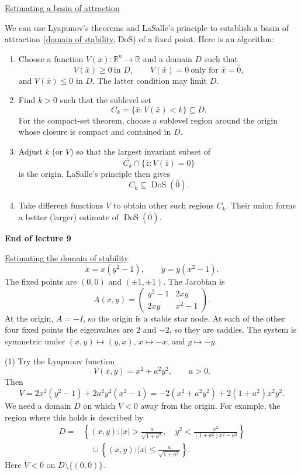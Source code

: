 \documentclass[11pt,a4paper]{article}
\begin{document}
\medskip
\noindent\underline{Estimating a basin of attraction}

\medskip
\noindent We can use Lyapunov's theorems and LaSalle's principle to establish
a basin of attraction (\underline{domain of stability}, DoS) of a fixed point.
Here is an algorithm:
\begin{enumerate}
\setlength{\itemsep}{9pt}
\item Choose a function $V(\bar x):\mathbb R^n\to\mathbb R$ and a domain $D$
such that
\[
V(\bar x)\geq0\ \text{in }D,\qquad
V(\bar x)=0\ \text{only for }\bar x=\bar0,
\]
and $\dot V(\bar x)\leq0$ in $D$. The latter condition may limit $D$.
\item Find $k>0$ such that the sublevel set
\[
C_k=\{\bar x:V(\bar x)<k\}\subseteq D.
\]
For the compact-set theorem, choose a sublevel region around the origin
whose closure is compact and contained in $D$.
\item Adjust $k$ (or $V$) so that the largest invariant subset of
\[
\overline{C_k}\cap\{\bar z:\dot V(\bar z)=0\}
\]
is the origin. LaSalle's principle then gives
\[
C_k\subseteq\operatorname{DoS}(\bar0).
\]
\item Take different functions $V$ to obtain other such regions $C_k$.
Their union forms a better (larger) estimate of $\operatorname{DoS}(\bar0)$.
\end{enumerate}

\begin{center}
\textbf{End of lecture 9}
\end{center}

\newpage
\noindent{}\quad\underline{Estimating the domain of stability}
\[
\dot x=x(y^2-1),\qquad \dot y=y(x^2-1).
\]
The fixed points are $(0,0)$ and $(\pm1,\pm1)$. The Jacobian is
\[
A(x,y)=\begin{pmatrix}y^2-1&2xy\\2xy&x^2-1\end{pmatrix}.
\]
At the origin, $A=-I$, so the origin is a stable star node. At each of the
other four fixed points the eigenvalues are $2$ and $-2$, so they are saddles.
The system is symmetric under $(x,y)\mapsto(y,x)$, $x\mapsto-x$, and $y\mapsto-y$.

\medskip
\noindent (1) Try the Lyapunov function
\[
V(x,y)=x^2+a^2y^2,\qquad a>0.
\]
Then
\[
\dot V=2x^2(y^2-1)+2a^2y^2(x^2-1)
=-2(x^2+a^2y^2)+2(1+a^2)x^2y^2.
\]
We need a domain $D$ on which $\dot V<0$ away from the origin. For example,
the region where this holds is described by
\[
\begin{split}
D={}&\left\{(x,y): |x|>\frac{a}{\sqrt{1+a^2}},\quad
 y^2<\frac{x^2}{(1+a^2)x^2-a^2}\right\}\\
&\quad\cup\left\{(x,y): |x|\leq\frac{a}{\sqrt{1+a^2}}\right\}.
\end{split}
\]
Here $\dot V<0$ on $D\setminus\{(0,0)\}$.
\end{document}
